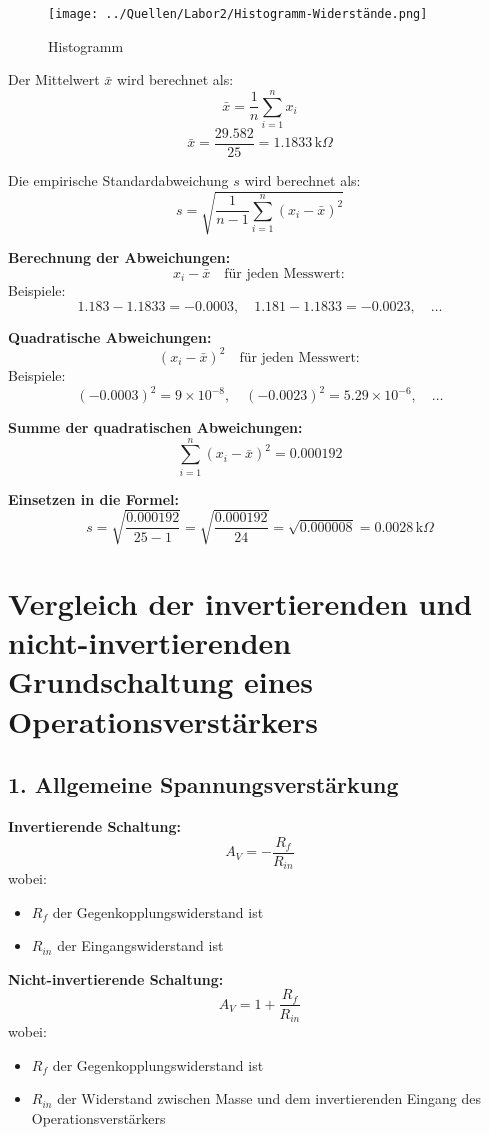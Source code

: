 \documentclass[a4paper,12pt]{article}
\begin{document}
\begin{figure}[H]
    \centering
    \texttt{[image: ../Quellen/Labor2/Histogramm-Widerstände.png]}
\caption{Histogramm}
\end{figure}

Der Mittelwert \( \bar{x} \) wird berechnet als:
\[
\bar{x} = \frac{1}{n} \sum_{i=1}^{n} x_i
\]
\[
\bar{x} = \frac{29.582}{25} = 1.1833 \, \text{k}\Omega
\]

Die empirische Standardabweichung \( s \) wird berechnet als:
\[
s = \sqrt{\frac{1}{n-1} \sum_{i=1}^{n} (x_i - \bar{x})^2}
\]

\textbf{Berechnung der Abweichungen:}
\[
x_i - \bar{x} \quad \text{für jeden Messwert}:
\]
Beispiele: 
\[
1.183 - 1.1833 = -0.0003, \quad 1.181 - 1.1833 = -0.0023, \quad \dots
\]

\textbf{Quadratische Abweichungen:}
\[
(x_i - \bar{x})^2 \quad \text{für jeden Messwert}:
\]
Beispiele:
\[
(-0.0003)^2 = 9 \times 10^{-8}, \quad (-0.0023)^2 = 5.29 \times 10^{-6}, \quad \dots
\]

\textbf{Summe der quadratischen Abweichungen:}
\[
\sum_{i=1}^{n} (x_i - \bar{x})^2 = 0.000192
\]

\textbf{Einsetzen in die Formel:}
\[
s = \sqrt{\frac{0.000192}{25 - 1}} = \sqrt{\frac{0.000192}{24}} = \sqrt{0.000008} = 0.0028 \, \text{k}\Omega
\]
\section*{Vergleich der invertierenden und nicht-invertierenden Grundschaltung eines Operationsverstärkers}

\subsection*{1. Allgemeine Spannungsverstärkung}
\textbf{Invertierende Schaltung:}
\[
A_V = -\frac{R_f}{R_{in}}
\]
wobei:
\begin{itemize}
    \item \( R_f \) der Gegenkopplungswiderstand ist
    \item \( R_{in} \) der Eingangswiderstand ist
\end{itemize}

\textbf{Nicht-invertierende Schaltung:}
\[
A_V = 1 + \frac{R_f}{R_{in}}
\]
wobei:
\begin{itemize}
    \item \( R_f \) der Gegenkopplungswiderstand ist
    \item \( R_{in} \) der Widerstand zwischen Masse und dem invertierenden Eingang des Operationsverstärkers
\end{itemize}
\end{document}
